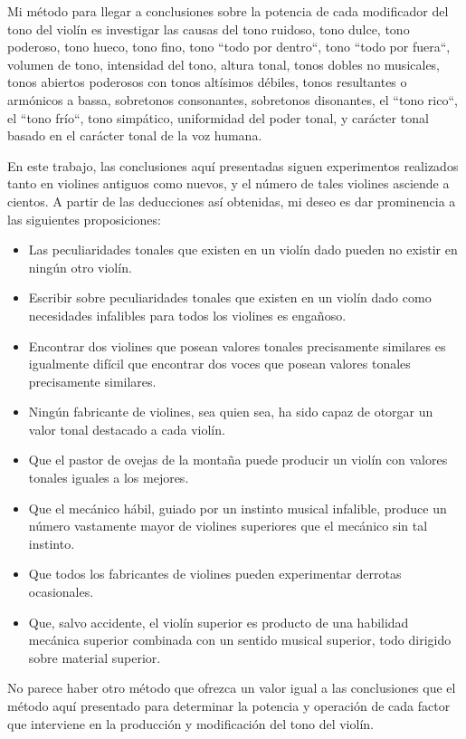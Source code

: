 \documentclass[12pt]{book}
\begin{document}
Mi método para llegar a conclusiones sobre la potencia de cada modificador del tono del violín es investigar las causas del tono ruidoso, tono dulce, tono poderoso, tono hueco, tono fino, tono ``todo por dentro``, tono ``todo por fuera``, volumen de tono, intensidad del tono, altura tonal, tonos dobles no musicales, tonos abiertos poderosos con tonos altísimos débiles, tonos resultantes o armónicos a bassa, sobretonos consonantes, sobretonos disonantes, el ``tono rico``, el ``tono frío``, tono simpático, uniformidad del poder tonal, y carácter tonal basado en el carácter tonal de la voz humana.

En este trabajo, las conclusiones aquí presentadas siguen experimentos realizados tanto en violines antiguos como nuevos, y el número de tales violines asciende a cientos. A partir de las deducciones así obtenidas, mi deseo es dar prominencia a las siguientes proposiciones:
\begin{itemize}
 \item Las peculiaridades tonales que existen en un violín dado pueden no existir en ningún otro violín.
 \item Escribir sobre peculiaridades tonales que existen en un violín dado como necesidades infalibles para todos los violines es engañoso.
 \item Encontrar dos violines que posean valores tonales precisamente similares es igualmente difícil que encontrar dos voces que posean valores tonales precisamente similares.
 \item Ningún fabricante de violines, sea quien sea, ha sido capaz de otorgar un valor tonal destacado a cada violín.
 \item Que el pastor de ovejas de la montaña puede producir un violín con valores tonales iguales a los mejores.
 \item Que el mecánico hábil, guiado por un instinto musical infalible, produce un número vastamente mayor de violines superiores que el mecánico sin tal instinto.
 \item Que todos los fabricantes de violines pueden experimentar derrotas ocasionales.
 \item Que, salvo accidente, el violín superior es producto de una habilidad mecánica superior combinada con un sentido musical superior, todo dirigido sobre material superior.
\end{itemize}
No parece haber otro método que ofrezca un valor igual a las conclusiones que el método aquí presentado para determinar la potencia y operación de cada factor que interviene en la producción y modificación del tono del violín.
\end{document}

